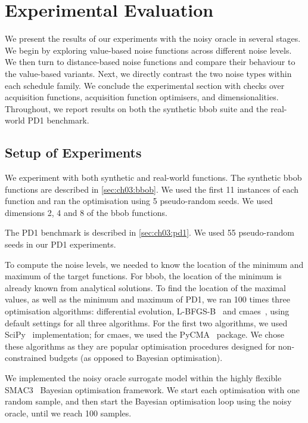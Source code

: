 \section{Experimental Evaluation}
\label{sec:ch08:experimental-evaluation}

We present the results of our experiments with the noisy oracle in several stages. We begin by exploring value-based noise functions across different noise levels. We then turn to distance-based noise functions and compare their behaviour to the value-based variants. Next, we directly contrast the two noise types within each schedule family. We conclude the experimental section with checks over acquisition functions, acquisition function optimisers, and dimensionalities. Throughout, we report results on both the synthetic \gls{bbob} suite and the real-world PD1 benchmark.

\subsection{Setup of Experiments}
We experiment with both synthetic and real-world functions.
The synthetic \gls{bbob} functions are described in \cref{sec:ch03:bbob}.
We used the first 11 instances of each function and ran the optimisation using 5 pseudo-random seeds. We used dimensions 2, 4 and 8 of the \gls{bbob} functions.

The PD1 benchmark is described in \cref{sec:ch03:pd1}.
We used 55 pseudo-random seeds in our PD1 experiments.

To compute the noise levels, we needed to know the location of the minimum and maximum of the target functions. For \gls{bbob}, the location of the minimum is already known from analytical solutions. To find the location of the maximal values, as well as the minimum and maximum of PD1, we ran 100 times three optimisation algorithms: differential evolution, L-BFGS-B~\citep{ByrEtAl95} and \gls{cmaes}~\citep{HanOst01}, using default settings for all three algorithms. For the first two algorithms, we used  SciPy~\citep{VirEtAl20} implementation; for \gls{cmaes}, we used the PyCMA~\citep{HanEtAl19} package.
We chose these algorithms as they are popular optimisation procedures designed for non-constrained budgets (as opposed to Bayesian optimisation).

We implemented the noisy oracle surrogate model within the highly flexible SMAC3~\citep{LinEtAl22b} Bayesian optimisation framework. We start each optimisation with one random sample, and then start the Bayesian optimisation loop using the noisy oracle, until we reach 100 samples.

